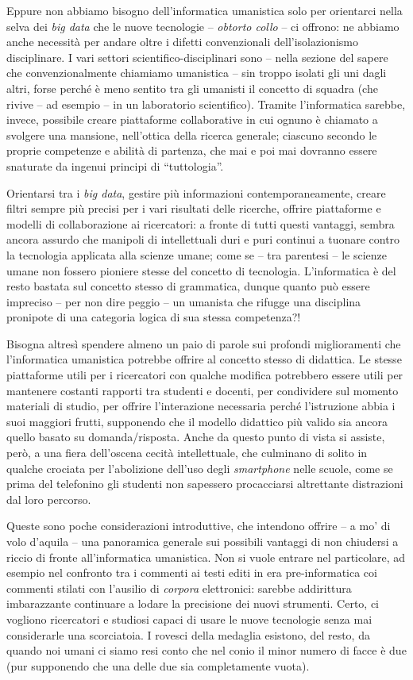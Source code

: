 \documentclass[
  b5paper,
  twoside,
  11pt,
  chapterprefix=false,
  bibliography=totocnumbered,
  parskip=0]{scrbook}
\begin{document}
Eppure non abbiamo bisogno dell'informatica umanistica solo per
orientarci nella selva dei \emph{big data} che le nuove tecnologie --
\emph{obtorto collo} -- ci offrono: ne abbiamo anche necessità per andare
oltre i difetti convenzionali dell'isolazionismo disciplinare. I vari
settori scientifico-disciplinari sono -- nella sezione del sapere che
convenzionalmente chiamiamo umanistica -- sin troppo isolati gli uni
dagli altri, forse perché è meno sentito tra gli umanisti il concetto di
squadra (che rivive -- ad esempio -- in un laboratorio scientifico).
Tramite l'informatica sarebbe, invece, possibile creare piattaforme
collaborative in cui ognuno è chiamato a svolgere una mansione,
nell'ottica della ricerca generale; ciascuno secondo le proprie
competenze e abilità di partenza, che mai e poi mai dovranno essere
snaturate da ingenui principi di \enquote{tuttologia}.

Orientarsi tra i \emph{big data}, gestire più informazioni
contemporaneamente, creare filtri sempre più precisi per i vari
risultati delle ricerche, offrire piattaforme e modelli di
collaborazione ai ricercatori: a fronte di tutti questi vantaggi, sembra
ancora assurdo che manipoli di intellettuali duri e puri continui a
tuonare contro la tecnologia applicata alla scienze umane; come se --
tra parentesi -- le scienze umane non fossero pioniere stesse del
concetto di tecnologia. L'informatica è del resto bastata sul concetto
stesso di grammatica, dunque quanto può essere impreciso -- per non dire
peggio -- un umanista che rifugge una disciplina pronipote di una
categoria logica di sua stessa competenza?!

Bisogna altresì spendere almeno un paio di parole sui profondi
miglioramenti che l'informatica umanistica potrebbe offrire al concetto
stesso di didattica. Le stesse piattaforme utili per i ricercatori con
qualche modifica potrebbero essere utili per mantenere costanti rapporti
tra studenti e docenti, per condividere sul momento materiali di studio,
per offrire l'interazione necessaria perché l'istruzione abbia i suoi
maggiori frutti, supponendo che il modello didattico più valido sia
ancora quello basato su domanda/risposta. Anche da questo punto di vista
si assiste, però, a una fiera dell'oscena cecità intellettuale, che
culminano di solito in qualche crociata per l'abolizione dell'uso degli
\emph{smartphone} nelle scuole, come se prima del telefonino gli studenti non
sapessero procacciarsi altrettante distrazioni dal loro percorso.

Queste sono poche considerazioni introduttive, che intendono offrire --
a mo' di volo d'aquila -- una panoramica generale sui possibili vantaggi
di non chiudersi a riccio di fronte all'informatica umanistica. Non si
vuole entrare nel particolare, ad esempio nel confronto tra i commenti
ai testi editi in era pre-informatica coi commenti stilati con l'ausilio
di \emph{corpora} elettronici: sarebbe addirittura imbarazzante continuare a
lodare la precisione dei nuovi strumenti. Certo, ci vogliono ricercatori
e studiosi capaci di usare le nuove tecnologie senza mai considerarle
una scorciatoia. I rovesci della medaglia esistono, del resto, da quando
noi umani ci siamo resi conto che nel conio il minor numero di facce è
due (pur supponendo che una delle due sia completamente vuota).
\end{document}

